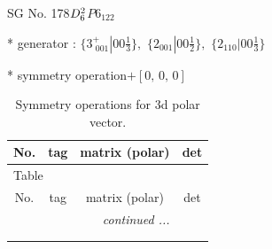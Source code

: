 \documentclass[fleqn,8pt]{jsarticle}
\begin{document}
\setcounter{MaxMatrixCols}{32}

\renewcommand{\tablename}{Table~}
\renewcommand{\figurename}{Figure~}
\begin{center}
\LARGE
SG No. 178\quad$D_{\rm 6}^{2}$\quad$P6_122$\quad[ hexagonal ]
\end{center}

* generator : $\{3^{+}_{\,\,001}|0 0 \frac{1}{3}\},\,\,\{2{}_{001}|0 0 \frac{1}{2}\},\,\,\{2{}_{110}|0 0 \frac{1}{3}\}$

* symmetry operation\quad$+\left[ 0,\, 0,\, 0 \right]$
\renewcommand{\arraystretch}{1.3}
\begin{longtable}{cccc}
\caption{Symmetry operations for 3d polar vector.}
 \\
 \hline \hline
No. & tag & matrix (polar) & det \\ \hline \endfirsthead

\multicolumn{3}{l}{\tablename\ \thetable{}} \\
 \hline \hline
No. & tag & matrix (polar) & det \\ \hline \endhead

 \hline \hline
\multicolumn{3}{r}{\footnotesize\it continued ...} \\ \endfoot

 \hline \hline
\multicolumn{3}{r}{} \\ \endlastfoot


\end{longtable}
\end{document}
